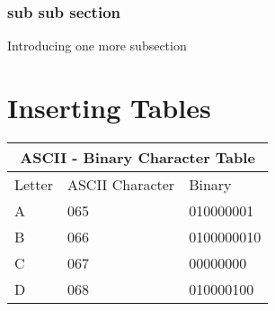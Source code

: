 \documentclass{article}
\begin{document}
\subsubsection{sub sub section}
Introducing one more subsection
\section{Inserting Tables}
\begin{tabular}{|p{3cm}|p{3cm}|p{3cm}|}
\hline
\multicolumn{3}{|c|}{ASCII - Binary Character Table}\\
\hline
\hline
Letter & ASCII Character & Binary\\
\hline
A&065&010000001\\
B&066&0100000010\\
C& 067& 00000000\\
D& 068& 010000100\\
\hline

\end{tabular}
\end{document}
